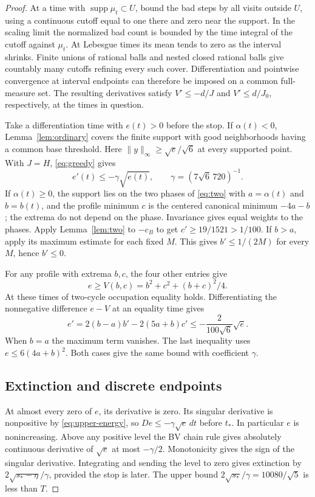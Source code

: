 \documentclass[11pt,reqno]{amsart}
\theoremstyle{remark}
\newcommand{\supp}{\operatorname{supp}}
\begin{document}
\begin{proof}
At a time with \(\supp\mu_t\subset U\), bound the bad steps by all visits outside \(U\), using a continuous cutoff equal to one there and zero near the support. In the scaling limit the normalized bad count is bounded by the time integral of the cutoff against \(\mu_t\). At Lebesgue times its mean tends to zero as the interval shrinks. Finite unions of rational balls and nested closed rational balls give countably many cutoffs refining every such cover. Differentiation and pointwise convergence at interval endpoints can therefore be imposed on a common full-measure set. The resulting derivatives satisfy \(V'\le-d/J\) and \(V'\le d/J_0\), respectively, at the times in question.

Take a differentiation time with \(e(t)>0\) before the stop. If \(\alpha(t)<0\), Lemma~\ref{lem:ordinary} covers the finite support with good neighborhoods having a common base threshold. Here \(\|y\|_\infty\ge\sqrt e/\sqrt6\) at every supported point. With \(J=H\), \eqref{eq:greedy} gives
\[
 e'(t)\le-\gamma\sqrt{e(t)},\qquad \gamma=(7\sqrt6\,720)^{-1}.
\]
If \(\alpha(t)\ge0\), the support lies on the two phases of \eqref{eq:two} with \(a=\alpha(t)\) and \(b=b(t)\), and the profile minimum \(c\) is the centered canonical minimum \(-4a-b\); the extrema do not depend on the phase. Invariance gives equal weights to the phases. Apply Lemma~\ref{lem:two} to \(-c_B\) to get \(c'\ge19/1521>1/100\). If \(b>a\), apply its maximum estimate for each fixed \(M\). This gives \(b'\le1/(2M)\) for every \(M\), hence \(b'\le0\).

For any profile with extrema \(b,c\), the four other entries give
\[
 e\ge V(b,c)=b^2+c^2+(b+c)^2/4.
\]
At these times of two-cycle occupation equality holds. Differentiating the nonnegative difference \(e-V\) at an equality time gives
\[
 e'=2(b-a)b'-2(5a+b)c'\le-\frac{2}{100\sqrt6}\sqrt e.
\]
When \(b=a\) the maximum term vanishes. The last inequality uses \(e\le6(4a+b)^2\). Both cases give the same bound with coefficient \(\gamma\).

\subsection{Extinction and discrete endpoints}\label{sec:extinction}
At almost every zero of \(e\), its derivative is zero. Its singular derivative is nonpositive by \eqref{eq:upper-energy}, so \(De\le-\gamma\sqrt e\,dt\) before \(t_*\). In particular \(e\) is nonincreasing. Above any positive level the BV chain rule gives absolutely continuous derivative of \(\sqrt e\) at most \(-\gamma/2\). Monotonicity gives the sign of the singular derivative. Integrating and sending the level to zero gives extinction by \(2\sqrt{s_*-\eta}/\gamma\), provided the stop is later. The upper bound \(2\sqrt{s_*}/\gamma=10080/\sqrt5\) is less than \(T\).


\end{proof}
\end{document}
